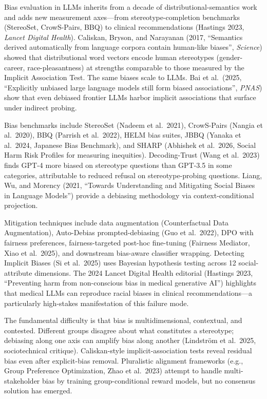 \documentclass{article}
\begin{document}
Bias evaluation in LLMs inherits from a decade of distributional-semantics work and adds new measurement axes---from stereotype-completion benchmarks (StereoSet, CrowS-Pairs, BBQ) to clinical recommendations (Hastings 2023, \emph{Lancet Digital Health}). Caliskan, Bryson, and Narayanan (2017, ``Semantics derived automatically from language corpora contain human-like biases'', \emph{Science}) showed that distributional word vectors encode human stereotypes (gender-career, race-pleasantness) at strengths comparable to those measured by the Implicit Association Test. The same biases scale to LLMs. Bai et al.~(2025, ``Explicitly unbiased large language models still form biased associations'', \emph{PNAS}) show that even debiased frontier LLMs harbor implicit associations that surface under indirect probing.

Bias benchmarks include StereoSet (Nadeem et al.~2021), CrowS-Pairs (Nangia et al.~2020), BBQ (Parrish et al.~2022), HELM bias suites, JBBQ (Yanaka et al.~2024, Japanese Bias Benchmark), and SHARP (Abhishek et al.~2026, Social Harm Risk Profiles for measuring inequities). Decoding-Trust (Wang et al.~2023) finds GPT-4 more biased on stereotype questions than GPT-3.5 in some categories, attributable to reduced refusal on stereotype-probing questions. Liang, Wu, and Morency (2021, ``Towards Understanding and Mitigating Social Biases in Language Models'') provide a debiasing methodology via context-conditional projection.

Mitigation techniques include data augmentation (Counterfactual Data Augmentation), Auto-Debias prompted-debiasing (Guo et al.~2022), DPO with fairness preferences, fairness-targeted post-hoc fine-tuning (Fairness Mediator, Xiao et al.~2025), and downstream bias-aware classifier wrapping. Detecting Implicit Biases (Si et al.~2025) uses Bayesian hypothesis testing across 12 social-attribute dimensions. The 2024 Lancet Digital Health editorial (Hastings 2023, ``Preventing harm from non-conscious bias in medical generative AI'') highlights that medical LLMs can reproduce racial biases in clinical recommendations---a particularly high-stakes manifestation of this failure mode.

The fundamental difficulty is that bias is multidimensional, contextual, and contested. Different groups disagree about what constitutes a stereotype; debiasing along one axis can amplify bias along another (Lindström et al.~2025, sociotechnical critique). Caliskan-style implicit-association tests reveal residual bias even after explicit-bias removal. Pluralistic alignment frameworks (e.g., Group Preference Optimization, Zhao et al.~2023) attempt to handle multi-stakeholder bias by training group-conditional reward models, but no consensus solution has emerged.
\end{document}
